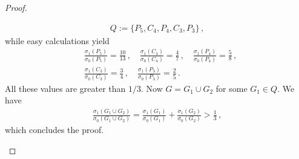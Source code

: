 \documentclass[10pt,a4paper]{amsart}
\begin{document}
\begin{proof}
\begin{itemize}
\begin{align*}
Q:=\{P_5,C_4,P_4,C_3,P_3\}\,,
\end{align*}
while easy calculations yield
\begin{align*}
&\frac{\sigma_1(P_5)}{\sigma_0(P_5)}=\frac{10}{13}\,, \quad \frac{\sigma_1(C_4)}{\sigma_0(C_4)}=\frac{4}{7}\,, \quad \frac{\sigma_1(P_4)}{\sigma_0(P_4)}=\frac{5}{8}\,, \\
&\frac{\sigma_1(C_3)}{\sigma_0(C_3)}=\frac{3}{4}\,, \quad \frac{\sigma_1(P_3)}{\sigma_0(P_3)}=\frac{2}{5}\,.
\end{align*}
All these values are greater than $1/3$. Now $G=G_1 \cup G_2$ for some $G_1\in Q$. We have
\begin{align*}
\frac{ \sigma_1(G_1 \cup G_2)}{ \sigma_0(G_1 \cup G_2)}=\frac{ \sigma_1(G_1)}{ \sigma_0(G_1)}+\frac{ \sigma_1(G_2)}{\sigma_0(G_2)} > \frac{1}{3}\,,
\end{align*}
which concludes the proof.
\end{itemize}

\end{proof}
\end{document}
